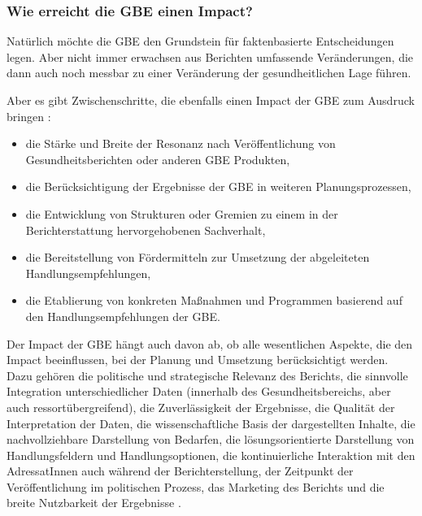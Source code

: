 \documentclass{article}
\begin{document}
\subsubsection{Wie erreicht die GBE einen Impact?}\label{H6199644}



Natürlich möchte die GBE den Grundstein für faktenbasierte Entscheidungen legen. Aber nicht immer erwachsen aus Berichten umfassende Veränderungen, die dann auch noch messbar zu einer Veränderung der gesundheitlichen Lage führen. 


Aber es gibt Zwischenschritte, die ebenfalls einen Impact der GBE zum Ausdruck bringen \autocite{RosenkötterNundweitere2020}: 

\begin{itemize}
\item die Stärke und Breite der Resonanz nach Veröffentlichung von Gesundheitsberichten oder anderen GBE Produkten, 


\item die Berücksichtigung der Ergebnisse der GBE in weiteren Planungsprozessen, 


\item die Entwicklung von Strukturen oder Gremien zu einem in der Berichterstattung hervorgehobenen Sachverhalt, 


\item die Bereitstellung von Fördermitteln zur Umsetzung der abgeleiteten Handlungsempfehlungen, 


\item die Etablierung von konkreten Maßnahmen und Programmen basierend auf den Handlungsempfehlungen der GBE.


\end{itemize}

Der Impact der GBE hängt auch davon ab, ob alle wesentlichen Aspekte, die den Impact beeinflussen, bei der Planung und Umsetzung berücksichtigt werden. Dazu gehören die politische und strategische Relevanz des Berichts, die sinnvolle Integration unterschiedlicher Daten (innerhalb des Gesundheitsbereichs, aber auch ressortübergreifend), die  Zuverlässigkeit der Ergebnisse, die Qualität der Interpretation der Daten, die wissenschaftliche Basis der dargestellten Inhalte, die nachvollziehbare Darstellung von Bedarfen, die lösungsorientierte Darstellung von Handlungsfeldern und Handlungsoptionen, die kontinuierliche Interaktion mit den AdressatInnen auch während der Berichterstellung, der Zeitpunkt der Veröffentlichung im politischen Prozess, das Marketing des Berichts und die breite Nutzbarkeit der Ergebnisse \autocite{VanBon-MartensMarjaundweitere2012}\autocite{VanBon-MartensMJundweitere2019} \autocite{RosenkötterNundweitere2020}.
\end{document}
